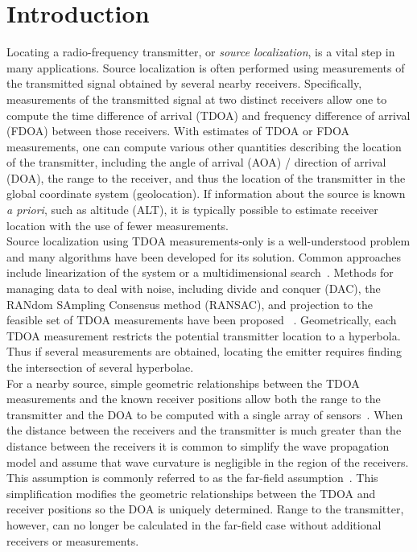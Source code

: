 \section{Introduction}
\label{s:intro}
Locating a radio-frequency transmitter, or \emph{source localization}, is a vital step in many applications. Source localization is often performed using measurements of the transmitted signal obtained by several nearby receivers. Specifically, measurements of the transmitted signal at two distinct receivers allow one to compute the time difference of arrival (TDOA) and frequency difference of arrival (FDOA) between those receivers. With estimates of TDOA or FDOA measurements, one can compute various other quantities describing the location of the transmitter, including the angle of arrival (AOA) / direction of arrival (DOA), the range to the receiver, and thus the location of the transmitter in the global coordinate system (geolocation). If information about the source is known {\em a priori}, such as altitude (ALT), it is typically possible to estimate receiver location with the use of fewer measurements. \\

Source localization using TDOA measurements-only is a well-understood problem and many algorithms have been developed for its solution. Common approaches include linearization of the system or a multidimensional search~\cite{Torrieri1984}. Methods for managing data to deal with noise, including divide and conquer (DAC), the RANdom SAmpling Consensus method (RANSAC), and projection to the feasible set of TDOA measurements have been proposed ~\cite{Cameron,Abel1990,Li2009,Compagnoni2017}. Geometrically, each TDOA measurement restricts the potential transmitter location to a hyperbola. Thus if several measurements are obtained, locating the emitter requires finding the intersection of several hyperbolae. \\

For a nearby source, simple geometric relationships between the TDOA measurements and the known receiver positions allow both the range to the transmitter and the DOA to be computed with a single array of sensors~\cite{Benesty2008}. When the distance between the receivers and the transmitter is much greater than the distance between the receivers it is common to simplify the wave propagation model and assume that wave curvature is negligible in the region of the receivers. This assumption is commonly referred to as the far-field assumption~\cite{Cheney2009}. This simplification modifies the geometric relationships between the TDOA and receiver positions so the DOA is uniquely determined. Range to the transmitter, however, can no longer be calculated in the far-field case without additional receivers or measurements.~\cite{Benesty2008} \\

